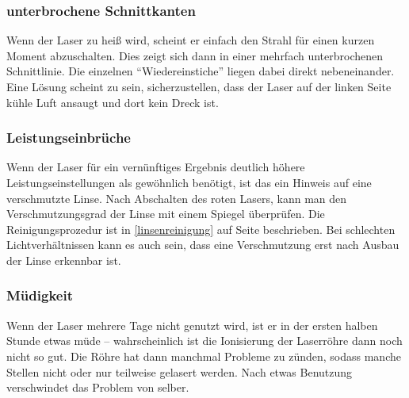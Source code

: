 \documentclass{\basedir/fablab-document}
\begin{document}
	\subsubsection{unterbrochene Schnittkanten}
	Wenn der Laser zu heiß wird, scheint er einfach den Strahl für einen kurzen Moment abzuschalten. Dies zeigt sich dann in einer mehrfach unterbrochenen Schnittlinie. Die einzelnen \enquote{Wiedereinstiche} liegen dabei direkt nebeneinander. Eine Lösung scheint zu sein, sicherzustellen, dass der Laser auf der linken Seite kühle Luft ansaugt und dort kein Dreck ist.
	\subsubsection{Leistungseinbrüche}
	Wenn der Laser für ein vernünftiges Ergebnis deutlich höhere Leistungseinstellungen als gewöhnlich benötigt, ist das ein Hinweis auf eine verschmutzte Linse. Nach Abschalten des roten Lasers, kann man den Verschmutzungsgrad der Linse mit einem Spiegel überprüfen. Die Reinigungsprozedur ist in \ref{linsenreinigung} auf Seite \pageref{linsenreinigung} beschrieben. Bei schlechten Lichtverhältnissen kann es auch sein, dass eine Verschmutzung erst nach Ausbau der Linse erkennbar ist.
	\subsubsection{Müdigkeit}
	Wenn der Laser mehrere Tage nicht genutzt wird, ist er in der ersten halben Stunde etwas müde -- wahrscheinlich ist die Ionisierung der Laserröhre dann noch nicht so gut. Die Röhre hat dann manchmal Probleme zu zünden, sodass manche Stellen nicht oder nur teilweise gelasert werden. Nach etwas Benutzung verschwindet das Problem von selber.
	
	
	\newpage
	
\end{document}
